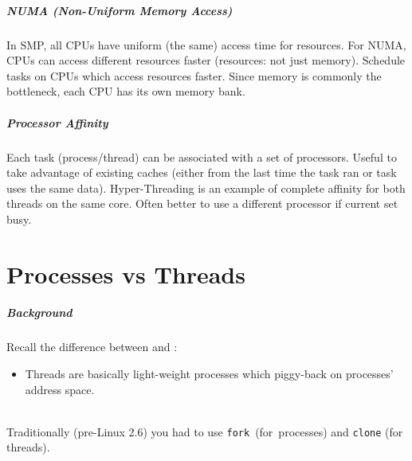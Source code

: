 \documentclass[aspectratio=43]{beamer}
\newenvironment{changemargin}[1]{%
  \begin{list}{}{%
    \setlength{\topsep}{0pt}%
    \setlength{\leftmargin}{#1}%
    \setlength{\rightmargin}{1em}
    \setlength{\listparindent}{\parindent}%
    \setlength{\itemindent}{\parindent}%
    \setlength{\parsep}{\parskip}%
  }%
  \item[]}{\end{list}}
\begin{document}
\begin{frame}
  \frametitle{NUMA (Non-Uniform Memory Access)}

  \begin{changemargin}{2.5cm}
    In SMP, all CPUs have uniform (the same) access time for resources.
    \vfill
    For NUMA, CPUs can access different resources faster (resources: not just
          memory).
    \vfill
    Schedule tasks on CPUs which access resources faster.
    \vfill
    Since memory is commonly the bottleneck, each CPU has its own memory
          bank.
  \end{changemargin}
\end{frame}

\begin{frame}
  \frametitle{Processor Affinity}

  \begin{changemargin}{2cm}
    Each task (process/thread) can be associated with a set of processors.
    \vfill
    Useful to take advantage of existing caches (either from the last time
          the task ran or task uses the same data).
    \vfill
    Hyper-Threading is an example of complete affinity for both threads on
          the same core.
    \vfill
    Often better to use a different processor if current set busy.
  \end{changemargin}
\end{frame}

\part{Processes vs Threads}

\begin{frame}[fragile]
  \partpage
\end{frame}

\begin{frame}[fragile]
  \frametitle{Background}

  \begin{changemargin}{2.5cm}
  Recall the difference between  and 
          :
  \begin{itemize}
    \item Threads are basically light-weight processes which piggy-back on
          processes' address space.
  \end{itemize} ~\\
  Traditionally (pre-Linux 2.6) you had to use {\tt fork}~(for~processes) and {\tt clone} (for threads).
  \end{changemargin}

\end{frame}
\end{document}
